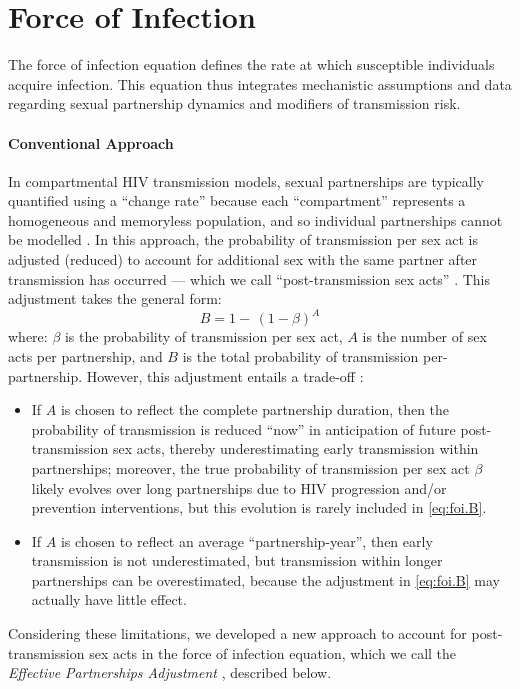\section{Force of Infection}\label{foi}
The force of infection equation defines the rate at which susceptible individuals acquire infection.
This equation thus integrates mechanistic assumptions and data regarding
sexual partnership dynamics and modifiers of transmission risk.
\paragraph{Conventional Approach}
In compartmental HIV transmission models,
sexual partnerships are typically quantified using a ``change rate''
because each ``compartment'' represents a homogeneous and memoryless population,
and so individual partnerships cannot be modelled \cite{Rao2021}.
In this approach, the probability of transmission per sex act is adjusted (reduced)
to account for additional sex with the same partner after transmission has occurred
--- which we call ``post-transmission sex acts'' \cite{Knight2022smdm}.
This adjustment takes the general form:
\begin{equation}\label{eq:foi.B}
  B = 1 -\,{(1-\beta)}^A
\end{equation} where:
$\beta$ is the probability of transmission per sex act,
$A$ is the number of sex acts per partnership, and
$B$ is the total probability of transmission per-partnership.
However, this adjustment entails a trade-off \cite{Knight2022smdm}:
\begin{itemize}
  \item If $A$ is chosen to reflect the complete partnership duration, then
  the probability of transmission is reduced ``now''
  in anticipation of future post-transmission sex acts,
  thereby underestimating early transmission within partnerships;
  moreover, the true probability of transmission per sex act $\beta$
  likely evolves over long partnerships due to
  HIV progression and/or prevention interventions,
  but this evolution is rarely included in \eqref{eq:foi.B}.
  \item If $A$ is chosen to reflect an average ``partnership-year'', then
  early transmission is not underestimated,
  but transmission within longer partnerships can be overestimated,
  because the adjustment in \eqref{eq:foi.B} may actually have little effect.
\end{itemize}
Considering these limitations, we developed
a new approach to account for post-transmission sex acts in the force of infection equation,
which we call the \emph{Effective Partnerships Adjustment} \cite{Knight2022smdm}, described below.
